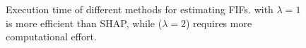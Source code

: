 \begin{figure}
	\centering
	\caption[Execution time of FIFs in $ \mathsf{SP} $]{Execution time of different methods for estimating FIFs. {\fairXplainer} with $ \lambda = 1 $ is more efficient than SHAP, while {\fairXplainer} ($ \lambda = 2 $) requires more computational effort.
	}
	\label{fairness_fairXplainer_fig:execution_time_cactus_plot}
\end{figure}

